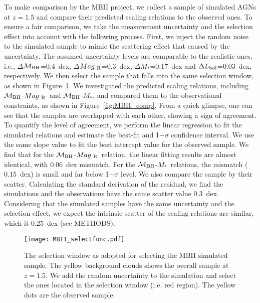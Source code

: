 \documentclass{natureprintstyle}
\newcommand{\mbh}{$\mathcal M_{\rm BH}$}
\newcommand{\mr}{$Mag_{\rm ~R}$}
\newcommand{\mstar}{{$M_*$}}
\begin{document}
To make comparison by the MBII project, we collect a sample of simulated AGNs at $z=1.5$ and compare their predicted scaling relations to the observed ones. To ensure a fair comparison, we take the measurement uncertainty and the selection effect into account with the following process. First, we inject the random noise to the simulated sample to mimic the scattering effect that caused by the uncertainty. The assumed uncertainty levels are comparable to the realistic ones, i.e., $\Delta$\mbh =0.4~dex, $\Delta$\mr=0.3~dex, $\Delta$\mstar=0.17~dex and $\Delta L_{\rm bol}$=0.03~dex, respectively. We then select the sample that falls into the same selection window, as shown in Figure~\ref{fig:selectfunc}. We investigated the predicted scaling relations, including \mbh-\mr\ and \mbh-\mstar, and compared them to the observational constraints, as shown in Figure~\ref{fig:MBII_comp}. From a quick glimpse, one can see that the samples are overlapped with each other, showing a sign of agreement. To quantify the level of agreement, we perform the linear regression to fit the simulated relations and estimate the best-fit and 1$-\sigma$ confidence interval. We use the same slope value to fit the best intercept value for the observed sample. We find that for the \mbh-\mr\ relation, the linear fitting results are almost identical, with $0.06$~dex mismatch. For the \mbh-\mstar\ relations, the mismatch ($0.15$~dex) is small and far below 1$-\sigma$ level. We also compare the sample by their scatter. Calculating the standard derivation of the residual, we find the simulations and the observations have the same scatter value $0.3$~dex. Considering that the simulated samples have the same uncertainty and the selection effect, we expect the intrinsic scatter of the scaling relations are similar, which it $0.25$~dex (see METHODS).

\begin{figure}[t]
\texttt{[image: MBII\_selectfunc.pdf]}
\caption{The selection window as adopted for selecting the MBII simulated sample. The yellow background clouds shows the overall sample at $z=1.5$. We add the random uncertainty to the simulation and select the ones located in the selection window (i.e. red region). The yellow dots are the observed sample.}
\label{fig:selectfunc}
\end{figure}
\end{document}
